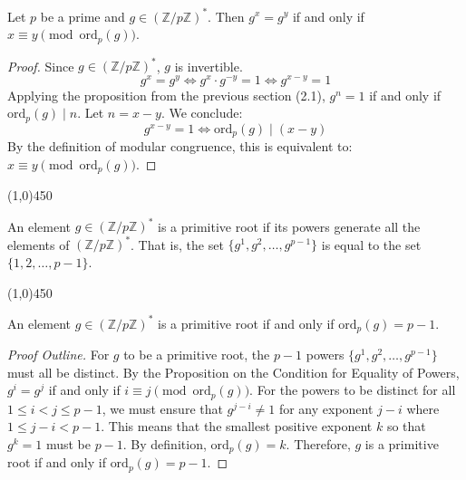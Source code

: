 \begin{proposition}
Let $p$ be a prime and $g \in (\mathbb{Z}/p\mathbb{Z})^*$. Then $g^x = g^y$ if and only if $x \equiv y \pmod{\text{ord}_p(g)}$.
\end{proposition}
\begin{proof}
Since $g \in (\mathbb{Z}/p\mathbb{Z})^*$, $g$ is invertible.
$$
g^x = g^y \iff g^x \cdot g^{-y} = 1 \iff g^{x-y} = 1
$$
Applying the proposition from the previous section (2.1), $g^n = 1$ if and only if $\text{ord}_p(g) \mid n$.
Let $n = x-y$. We conclude:
$$
g^{x-y} = 1 \iff \text{ord}_p(g) \mid (x-y)
$$
By the definition of modular congruence, this is equivalent to: $x \equiv y \pmod{\text{ord}_p(g)}$.
\end{proof}

\begin{center}
    \vspace{10pt}
    \line(1,0){450}
    \vspace{25pt}
\end{center}

\begin{definition}
An element $g \in (\mathbb{Z}/p\mathbb{Z})^*$ is a primitive root if its powers generate all the elements of $(\mathbb{Z}/p\mathbb{Z})^*$. That is, the set $\{ g^1, g^2, \ldots, g^{p-1} \}$ is equal to the set $\{ 1, 2, \ldots, p-1 \}$.
\end{definition}

\begin{center}
    \vspace{10pt}
    \line(1,0){450}
    \vspace{25pt}
\end{center}

\begin{theorem}
An element $g \in (\mathbb{Z}/p\mathbb{Z})^*$ is a primitive root if and only if $\text{ord}_p(g) = p-1$.
\end{theorem}
\begin{proof}[Proof Outline]
For $g$ to be a primitive root, the $p-1$ powers $\{ g^1, g^2, \ldots, g^{p-1} \}$ must all be distinct.
By the Proposition on the Condition for Equality of Powers, $g^i = g^j$ if and only if $i \equiv j \pmod{\text{ord}_p(g)}$.
For the powers to be distinct for all $1 \le i < j \le p-1$, we must ensure that $g^{j-i} \ne 1$ for any exponent $j-i$ where $1 \le j-i < p-1$.
This means that the smallest positive exponent $k$ so that $g^k = 1$ must be $p-1$.
By definition, $\text{ord}_p(g) = k$.
Therefore, $g$ is a primitive root if and only if $\text{ord}_p(g) = p-1$.
\end{proof}

